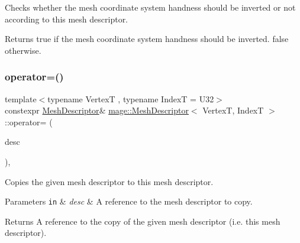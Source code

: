 Checks whether the mesh coordinate system handness should be inverted or not according to this mesh descriptor.

\begin{DoxyReturn}{Returns}
{\ttfamily true} if the mesh coordinate system handness should be inverted. {\ttfamily false} otherwise. 
\end{DoxyReturn}
\hypertarget{structmage_1_1_mesh_descriptor_a022e345285b4d307e69ddafe6a478a97}{}\label{structmage_1_1_mesh_descriptor_a022e345285b4d307e69ddafe6a478a97} 
\subsubsection{\texorpdfstring{operator=()}{operator=()}\hspace{0.1cm}{\footnotesize\ttfamily [1/2]}}
{\footnotesize\ttfamily template$<$typename VertexT , typename IndexT  = U32$>$ \\
constexpr \hyperlink{structmage_1_1_mesh_descriptor}{Mesh\+Descriptor}\& \hyperlink{structmage_1_1_mesh_descriptor}{mage\+::\+Mesh\+Descriptor}$<$ VertexT, IndexT $>$\+::operator= (\begin{DoxyParamCaption}\item[{const \hyperlink{structmage_1_1_mesh_descriptor}{Mesh\+Descriptor}$<$ VertexT, IndexT $>$ \&}]{desc }\end{DoxyParamCaption})\hspace{0.3cm}{\ttfamily [default]}, {\ttfamily [noexcept]}}

Copies the given mesh descriptor to this mesh descriptor.


\begin{DoxyParams}[1]{Parameters}
\mbox{\tt in}  & {\em desc} & A reference to the mesh descriptor to copy. \\
\hline
\end{DoxyParams}
\begin{DoxyReturn}{Returns}
A reference to the copy of the given mesh descriptor (i.\+e. this mesh descriptor). 
\end{DoxyReturn}
\hypertarget{structmage_1_1_mesh_descriptor_abc2aa63cc03fd7b7ca736129bd5bc0fd}{}\label{structmage_1_1_mesh_descriptor_abc2aa63cc03fd7b7ca736129bd5bc0fd} 
